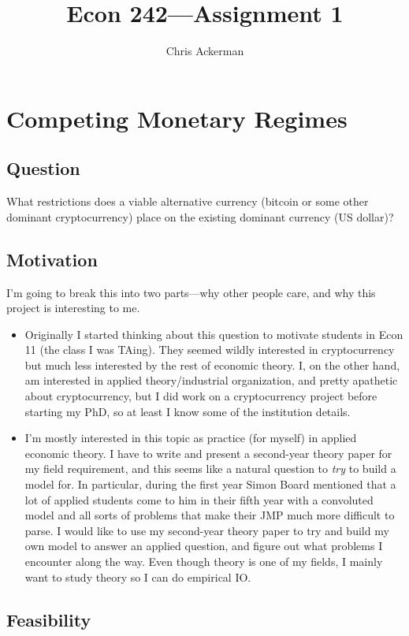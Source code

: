 \documentclass[dvipsnames]{article}
\title{Econ 242---Assignment 1}
\author{Chris Ackerman}
\begin{document}
\maketitle
\section{Competing Monetary Regimes}
\subsection{Question}
What restrictions does a viable alternative currency (bitcoin or some other dominant cryptocurrency) place on the existing dominant currency (US dollar)?
\subsection{Motivation}
I'm going to break this into two parts---why other people care, and why this project is interesting to me.
\begin{itemize}
\item Originally I started thinking about this question to motivate students in Econ 11 (the class I was TAing). They seemed wildly interested in cryptocurrency but much less interested by the rest of economic theory. I, on the other hand, am interested in applied theory/industrial organization, and pretty apathetic about cryptocurrency, but I did work on a cryptocurrency project before starting my PhD, so at least I know some of the institution details.
\item I'm mostly interested in this topic as practice (for myself) in applied economic theory. I have to write and present a second-year theory paper for my field requirement, and this seems like a natural question to \emph{try} to build a model for. In particular, during the first year Simon Board mentioned that a lot of applied students come to him in their fifth year with a convoluted model and all sorts of problems that make their JMP much more difficult to parse. I would like to use my second-year theory paper to try and build my own model to answer an applied question, and figure out what problems I encounter along the way. Even though theory is one of my fields, I mainly want to study theory so I can do empirical IO.
\end{itemize}

\subsection{Feasibility}
\end{document}

